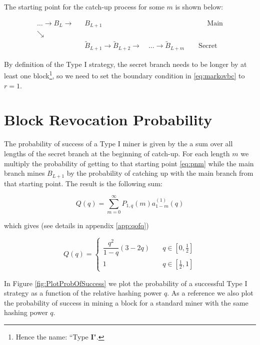 \documentclass[letterpaper,12pt]{report}
\begin{document}
The starting point for the catch-up process for some $m$ is shown below:

\begin{eqnarray}\label{blockhidingboundary}
 \dots \rightarrow \mathit{B}_L\rightarrow &\mathit{B}_{L+1} \qquad\qquad\qquad\qquad\qquad\qquad\qquad\quad \mathrm{Main}\\\nonumber
\searrow & \\\nonumber
\qquad \qquad \qquad & \widetilde{\mathit{B}}_{L+1}\rightarrow\widetilde{\mathit{B}}_{L+2}
\longrightarrow \quad \dots \longrightarrow\widetilde{\mathit{B}}_{L+m}\qquad \mathrm{Secret}
\end{eqnarray}

By definition of the Type I strategy, the secret branch needs to be longer by at least one block\footnote{Hence the name: ``Type \textbf{I}".}, so we need to set the boundary condition in \ref{eq:markovbc} to $r=1$. 

\section{Block Revocation Probability}

The probability of success of a Type I miner is given by the a sum over all lengths of the secret branch at the beginning of catch-up. For each length $m$ we multiply the probability of getting to that starting point \ref{eq:pnm} while the main branch mines $\mathit{B}_{L+1}$ by the probability of catching up with the main branch from that starting point. The result is the following sum: 

\begin{equation}\label{eq:qofpdef}
\mathit{Q}(q)=\sum_{m=0}^{\infty}\mathit{P}_{1,q}(m)\mathit{a}^{(1)}_{1-m}(q)
\end{equation}

which gives (see details in appendix \ref{app:qofq})

\begin{equation}\label{eq:qofp}
\mathit{Q}(q)=
\begin{cases}
\dfrac{q^2}{1-q}\left(3-2q\right) & \quad q \in [0,\frac{1}{2}] \\
1 & \quad q \in [\frac{1}{2},1] 
\end{cases}
\end{equation}

In Figure \ref{fig:PlotProbOfSuccess} we plot the probability of a successful Type I strategy as a function of the relative hashing power $q$. As a reference we also plot the probability of success in mining a block for a standard miner with the same hashing power $q$.
\end{document}
